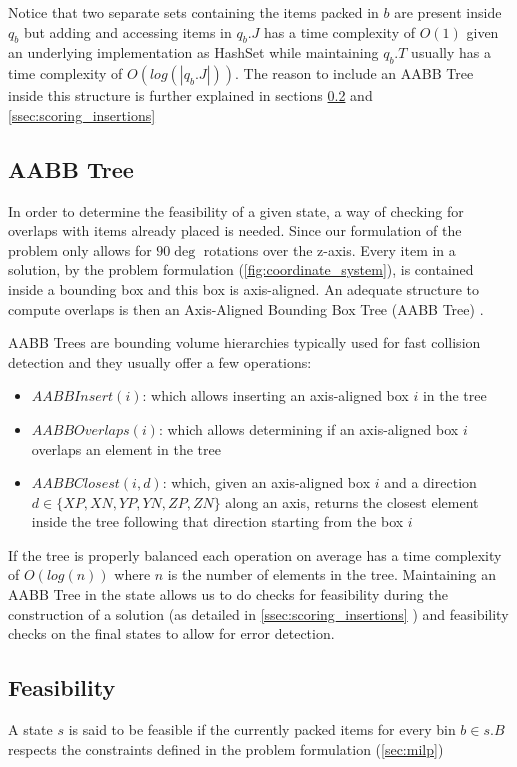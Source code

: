 Notice that two separate sets containing the items packed in $b$ are present inside $q_b$ but adding and accessing items in $q_b.J$ has a time complexity of $O(1)$ given an underlying implementation as HashSet while maintaining $q_b.T$ usually has a time complexity of $O(log(|q_b.J|))$.
The reason to include an AABB Tree inside this structure is further explained in sections \ref{sec:problem_state:feasibility} and \ref{ssec:scoring_insertions}

\subsection{AABB Tree}
\label{sec:problem_state:aabbtree}%

In order to determine the feasibility of a given state, a way of checking for overlaps with items already placed is needed.
Since our formulation of the problem only allows for $90\deg$ rotations over the z-axis. Every item in a solution, by the problem formulation (\ref{fig:coordinate_system}), is contained inside a bounding box and this box is axis-aligned.
An adequate structure to compute overlaps is then an Axis-Aligned Bounding Box Tree (AABB Tree) \cite{bergen1997efficient}.

AABB Trees are bounding volume hierarchies typically used for fast collision detection and they usually offer a few operations:
\begin{itemize}
    \item $AABBInsert(i)$: which allows inserting an axis-aligned box $i$ in the tree
    \item $AABBOverlaps(i)$: which allows determining if an axis-aligned box $i$ overlaps an element in the tree
    \item $AABBClosest(i, d)$: which, given an axis-aligned box $i$ and a direction \\$d \in \{ XP, XN, YP, YN, ZP, ZN \}$ along an axis, returns the closest element inside the tree following that direction starting from the box $i$
\end{itemize}

If the tree is properly balanced each operation on average has a time complexity of $O(log(n))$ where $n$ is the number of elements in the tree.
Maintaining an AABB Tree in the state allows us to do checks for feasibility during the construction of a solution (as detailed in \ref{ssec:scoring_insertions} ) and feasibility checks on the final states to allow for error detection.

\subsection{Feasibility}
\label{sec:problem_state:feasibility}%
A state $s$ is said to be feasible if the currently packed items for every bin $b \in s.B$ respects the constraints defined in the problem formulation (\ref{sec:milp})

